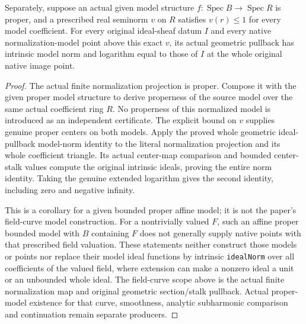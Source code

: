 \begin{theorem}
\label{scheme:normalization-given-bounded-model-functions}
\leanok
{}
Separately, suppose an actual given model structure
$f:\operatorname{Spec}B\to\operatorname{Spec}R$ is proper, and a
prescribed real seminorm $v$ on $R$ satisfies $v(r)\le1$ for every
model coefficient. For every original ideal-sheaf datum $I$ and every
native normalization-model point above this exact $v$, its actual
geometric pullback has intrinsic model norm and logarithm equal to
those of $I$ at the whole original native image point.
\end{theorem}
\begin{proof}
The actual finite normalization projection is proper. Compose it
with the given proper model structure to derive properness of the
source model over the same actual coefficient ring $R$. No properness
of this normalized model is introduced as an independent certificate.
The explicit bound on $v$ supplies genuine proper centers on both
models. Apply the proved whole geometric ideal-pullback model-norm
identity to the literal normalization projection and its whole
coefficient triangle. Its actual center-map comparison and bounded
center-stalk values compute the original intrinsic ideals, proving
the entire norm identity. Taking the genuine extended logarithm gives
the second identity, including zero and negative infinity.

This is a corollary for a given bounded proper affine model; it is
not the paper's field-curve model construction. For a nontrivially
valued $F$, such an affine proper bounded model with $B$ containing
$F$ does not generally supply native points with that prescribed
field valuation. These statements neither construct those models
or points nor replace their model ideal functions by intrinsic
\texttt{idealNorm} over all coefficients of the valued field, where
extension can make a nonzero ideal a unit or an unbounded whole ideal.
The field-curve scope above is the actual finite normalization map
and original geometric section/stalk pullback. Actual proper-model
existence for that curve, smoothness, analytic subharmonic comparison
and continuation remain separate producers.
\end{proof}
